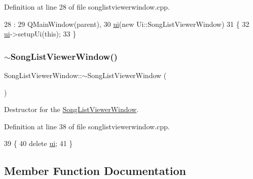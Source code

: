 Definition at line 28 of file songlistviewerwindow.\+cpp.


\begin{DoxyCode}
28                                                           :
29     QMainWindow(parent),
30     \mbox{\hyperlink{class_song_list_viewer_window_ac24fa09133b92a7b4cbd757f9b84258d}{ui}}(\textcolor{keyword}{new} Ui::SongListViewerWindow)
31 \{
32     \mbox{\hyperlink{class_song_list_viewer_window_ac24fa09133b92a7b4cbd757f9b84258d}{ui}}->setupUi(\textcolor{keyword}{this});
33 \}
\end{DoxyCode}
\mbox{\label{class_song_list_viewer_window_a563ac79baf2458f7f33c961fb433541d}} 
\subsubsection{\texorpdfstring{$\sim$\+Song\+List\+Viewer\+Window()}{~SongListViewerWindow()}}
{\footnotesize\ttfamily Song\+List\+Viewer\+Window\+::$\sim$\+Song\+List\+Viewer\+Window (\begin{DoxyParamCaption}{ }\end{DoxyParamCaption})}



Destructor for the \mbox{\hyperlink{class_song_list_viewer_window}{Song\+List\+Viewer\+Window}}. 



Definition at line 38 of file songlistviewerwindow.\+cpp.


\begin{DoxyCode}
39 \{
40     \textcolor{keyword}{delete} \mbox{\hyperlink{class_song_list_viewer_window_ac24fa09133b92a7b4cbd757f9b84258d}{ui}};
41 \}
\end{DoxyCode}


\subsection{Member Function Documentation}
\mbox{\label{class_song_list_viewer_window_ad5f7f01b35b12fefb932fa8e10a83851}} 

